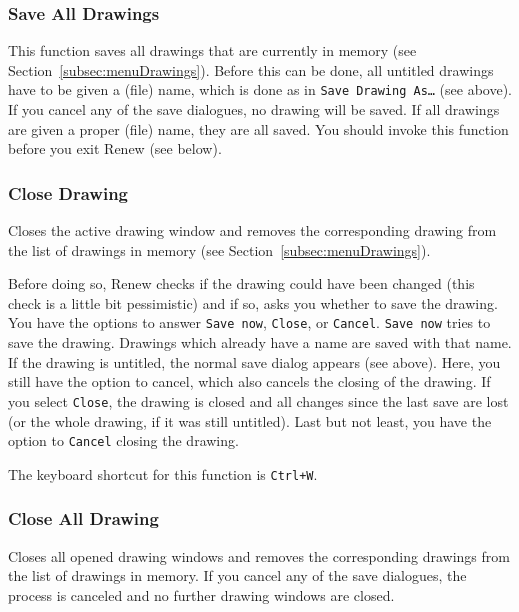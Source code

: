 \subsubsection{Save All Drawings}

This function saves all drawings that are currently in memory
(see Section~\ref{subsec:menuDrawings}).
Before this can be done, all untitled drawings have to be given
a (file) name, which is done as in \texttt{Save Drawing As\dots{}}
(see above).
If you cancel any of the save dialogues, no drawing will be saved.
If all drawings are given a proper (file) name, they are all saved.
You should invoke this function before you exit Renew (see below).

\subsubsection{Close Drawing}
\label{subsubsec:close}

Closes the active drawing window and removes the corresponding drawing
from the list of drawings in memory (see Section~\ref{subsec:menuDrawings}).

Before doing so, Renew checks if the drawing could have been
changed (this check is a little bit pessimistic) and if so,
asks you whether to save the drawing.
You have the options to answer \texttt{Save now}, \texttt{Close},
or \texttt{Cancel}.
\texttt{Save now} tries to save the drawing.
Drawings which already have a name are saved with that name.
If the drawing is untitled, the normal save dialog appears
(see above). Here, you still have the option to cancel, which
also cancels the closing of the drawing.
If you select \texttt{Close}, the drawing is closed and all
changes since the last save are lost (or the whole drawing,
if it was still untitled).
Last but not least, you have the option to \texttt{Cancel}
closing the drawing.

The keyboard shortcut for this function is \texttt{Ctrl+W}.

\subsubsection{Close All Drawing}

Closes all opened drawing windows and removes the corresponding drawings from the list of drawings in memory. If you cancel any of the save dialogues, the process is canceled and no further drawing windows are closed.

